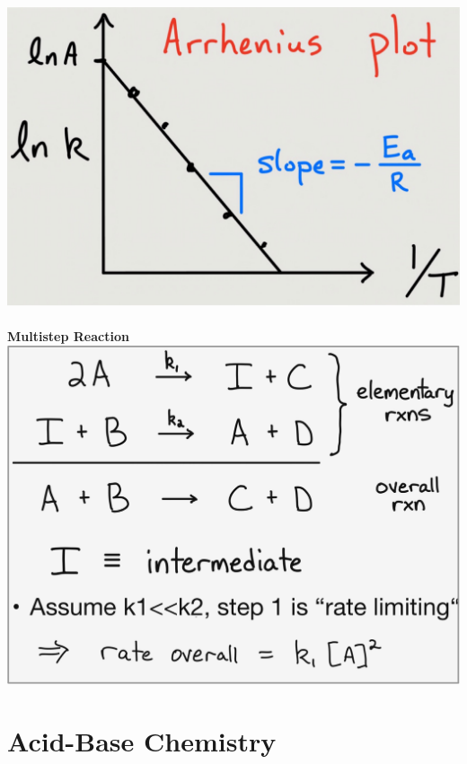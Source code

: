 \begin{minipage}{0.34\linewidth}
\begin{center}
    \includegraphics[width = 0.95\linewidth]{images/Arrhenius_Plot.jpeg}\\
    \\
    \textbf{Multistep Reaction}\\
    \includegraphics[width = 0.95\linewidth]{images/Multistep_Reaction.jpeg}
\end{center}
\end{minipage} 
\umbruch
\section{Acid-Base Chemistry}
